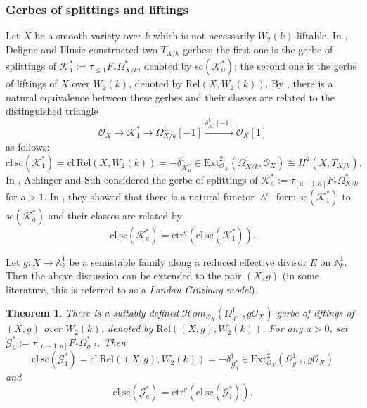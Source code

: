 \documentclass[12pt, a4paper]{article}
\newtheorem{theorem}{Theorem}[section]
\begin{document}
\subsubsection{Gerbes of splittings and liftings}
Let $X$ be a smooth variety over $k$ which is not necessarily $W_2(k)$-liftable. In \cite[\S3]{DI}, Deligne and Illusie constructed two $T_{X/k}$-gerbes: the first one is the gerbe of splittings of $\mathcal  K_1^*:=\tau_{\leq 1}F_*\Omega^*_{X/k}$, denoted by $\mathrm{sc}(\mathcal K_0^*)$; the second one is the gerbe of liftings of $X$ over $W_2(k)$, denoted by $\mathrm{Rel}(X,W_2(k))$. By \cite[Proposition 3.3, Théorème 3.5]{DI}, there is a natural equivalence between these gerbes and their classes are related to the distinguished triangle 
$$
\mathcal O_X\to\mathcal K^*_1\to\Omega^1_{X/k}[-1]\xrightarrow{\delta^1_{\mathcal K^*}[-1]}\mathcal O_X[1]
$$
 as follows:
$$
\mathrm{cl}~\mathrm{sc}(\mathcal K^*_1)=\mathrm{cl}~\mathrm{Rel}(X,W_2(k))=-\delta^1_{\mathcal K^*_0}\in\mathrm{Ext}^2_{\mathcal O_X}(\Omega^1_{X/k},\mathcal O_X)\cong H^2(X,T_{X/k}).
$$
In \cite[\S3]{AS}, Achinger and Suh considered the gerbe of splittings of $\mathcal K^*_a:=\tau_{[a-1,a]}F_*\Omega^*_{X/k}$ for $a>1$. In \cite[Theorem 3.9]{AS}, they showed that there is a natural functor $\wedge^a$ form $\mathrm{sc}(\mathcal K^*_1)$ to  $\mathrm{sc}(\mathcal K^*_a)$ and their classes are related by 
$$
\mathrm{cl}~\mathrm{sc}(\mathcal K^*_a)=\mathrm{ctr}^q(\mathrm{cl}~\mathrm{sc}(\mathcal K^*_1)).
$$

Let $g:X\to\mathbb A^1_k$ be a semistable family along a reduced effective divisor $E$ on $\mathbb A^1_k$. Then the above discussion can be extended to the pair $(X,g)$ (in some literature, this is referred to as a \emph{Landau-Ginzburg model}).  

\begin{theorem}
 There is a suitably defined $\mathcal Hom_{\mathcal O_X}(\Omega^1_{g^{-1}},g\mathcal O_X)$-gerbe of liftings of $(X,g)$ over $W_2(k)$, denoted by $\mathrm{Rel}((X,g),W_2(k))$. For any $a>0$, set $\mathcal G^*_a:=\tau_{[a-1,a]}F_*\Omega^*_{g^{-1}}$. Then
 $$
 \mathrm{cl}~\mathrm{sc}(\mathcal G^*_1)=\mathrm{cl}~\mathrm{Rel}((X,g),W_2(k))=-\delta^1_{\mathcal G^*_0}\in\mathrm{Ext}^2_{\mathcal O_X}(\Omega^1_{g^{-1}},g\mathcal O_X)
 $$
 and 
 $$
 \mathrm{cl}~\mathrm{sc}(\mathcal G^*_a)=\mathrm{ctr}^q(\mathrm{cl}~\mathrm{sc}(\mathcal G^*_1)).
 $$
\end{theorem}
\fi
\end{document}

